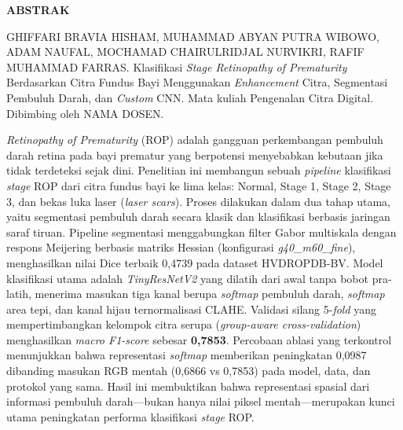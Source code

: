 
\clearpage
\thispagestyle{empty}

\begin{center}
{\fontsize{14pt}{17pt}\selectfont\bfseries ABSTRAK}
\end{center}

\vspace{6pt}

\noindent
GHIFFARI BRAVIA HISHAM, MUHAMMAD ABYAN PUTRA WIBOWO, ADAM NAUFAL,
MOCHAMAD CHAIRULRIDJAL NURVIKRI, RAFIF MUHAMMAD FARRAS.
Klasifikasi \textit{Stage Retinopathy of Prematurity} Berdasarkan Citra Fundus Bayi
Menggunakan \textit{Enhancement} Citra, Segmentasi Pembuluh Darah, dan \textit{Custom} CNN.
Mata kuliah Pengenalan Citra Digital. Dibimbing oleh NAMA DOSEN.

\vspace{12pt}

\noindent
\textit{Retinopathy of Prematurity} (ROP) adalah gangguan perkembangan pembuluh darah retina
pada bayi prematur yang berpotensi menyebabkan kebutaan jika tidak terdeteksi sejak dini.
Penelitian ini membangun sebuah \textit{pipeline} klasifikasi \textit{stage} ROP dari citra
fundus bayi ke lima kelas: Normal, Stage 1, Stage 2, Stage 3, dan bekas luka laser
(\textit{laser scars}). Proses dilakukan dalam dua tahap utama, yaitu segmentasi pembuluh darah
secara klasik dan klasifikasi berbasis jaringan saraf tiruan. Pipeline segmentasi
menggabungkan filter Gabor multiskala dengan respons Meijering berbasis matriks Hessian
(konfigurasi \textit{g40\_m60\_fine}), menghasilkan nilai Dice terbaik 0,4739 pada dataset
HVDROPDB-BV. Model klasifikasi utama adalah \textit{TinyResNetV2} yang dilatih dari awal tanpa
bobot pra-latih, menerima masukan tiga kanal berupa \textit{softmap} pembuluh darah, \textit{softmap} area tepi, dan kanal hijau ternormalisasi CLAHE. Validasi silang 5-\textit{fold} yang
mempertimbangkan kelompok citra serupa (\textit{group-aware cross-validation}) menghasilkan
\textit{macro F1-score} sebesar \textbf{0,7853}. Percobaan ablasi yang terkontrol menunjukkan bahwa
representasi \textit{softmap} memberikan peningkatan 0,0987 dibanding masukan RGB mentah
(0,6866 vs 0,7853) pada model, data, dan protokol yang sama. Hasil ini membuktikan bahwa
representasi spasial dari informasi pembuluh darah---bukan hanya nilai piksel mentah---merupakan
kunci utama peningkatan performa klasifikasi \textit{stage} ROP.

